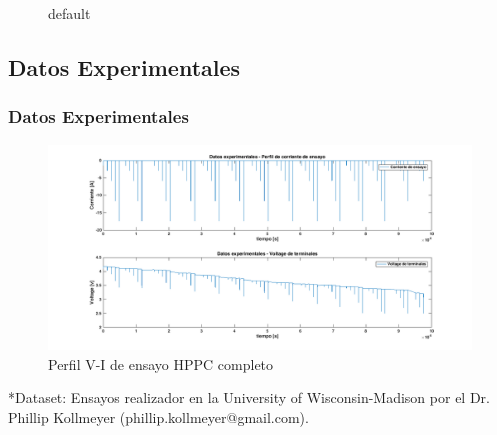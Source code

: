 \documentclass[10pt]{beamer}
\theoremstyle{remark}
\theoremstyle{definition}
\begin{document}
\begin{frame}
\begin{figure}[!b]
\caption{default}
\label{fig:figure3}

\end{figure}

\end{frame}

\subsection{Datos Experimentales}
\begin{frame}
\frametitle{ Datos Experimentales}

\begin{figure}
	\centering
	\includegraphics[width=1\linewidth]{images/HPPC-Completo}
	\caption{Perfil V-I de ensayo HPPC completo}
	\label{fig:perfildeensayohppc}
\end{figure}


*Dataset: Ensayos realizador en la University of Wisconsin-Madison por el Dr. Phillip Kollmeyer (phillip.kollmeyer@gmail.com). 

\end{frame}
\end{document}
